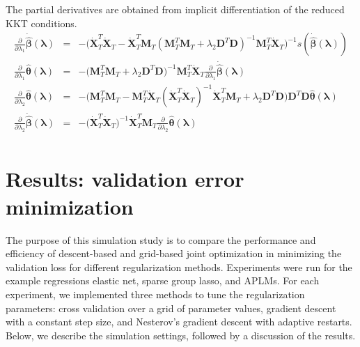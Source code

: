 \documentclass[10pt,letterpaper]{article}
\begin{document}
The partial derivatives are obtained from implicit differentiation of the reduced KKT conditions.
\begin{equation}
\begin{array}{lcl}
\frac{\partial}{\partial \lambda_1} \dot{\hat{\boldsymbol{\beta}}}(\boldsymbol{\lambda})  &=&
-\bigg(\dot{\boldsymbol{X}}_T^T \dot{\boldsymbol{X}}_T
- \dot{\boldsymbol{X}}_T^T \boldsymbol{M}_T(\boldsymbol{M}_T^T \boldsymbol{M}_T
+ \lambda_2 \boldsymbol{D}^T\boldsymbol{D})^{-1} \boldsymbol{M}_T^T \dot{\boldsymbol{X}}_T \bigg)^{-1} 
s( \dot{\hat{\boldsymbol{\beta}}}(\boldsymbol{\lambda})) \\
\frac{\partial }{\partial \lambda_1} \hat{\boldsymbol{\theta}}(\boldsymbol{\lambda}) &=&
-\bigg(\boldsymbol{M}_T^T \boldsymbol{M}_T
+ \lambda_2 \boldsymbol{D}^T \boldsymbol{D}\bigg)^{-1}
\boldsymbol{M}_T^T \dot{\boldsymbol{X}}_T \frac{\partial}{\partial \lambda_1} \dot{\hat{\boldsymbol{\beta}}}(\boldsymbol{\lambda})
\\
\frac{\partial}{\partial \lambda_2}  \hat{\boldsymbol{\theta}}(\boldsymbol{\lambda}) &=&
-\bigg(\boldsymbol{M}_T^T \boldsymbol{M}_T
- \boldsymbol{M}_T^T \dot{\boldsymbol{X}}_T (\dot{\boldsymbol{X}}_T^T\dot{\boldsymbol{X}}_T)^{-1} \dot{\boldsymbol{X}}_T^T \boldsymbol{M}_T + \lambda_2 \boldsymbol{D}^T\boldsymbol{D} \bigg)
\boldsymbol{D}^T\boldsymbol{D} \hat{\boldsymbol{\theta}}(\boldsymbol{\lambda})
\\
\frac{\partial}{\partial \lambda_2} \dot{\hat{\boldsymbol{\beta}}}(\boldsymbol{\lambda}) &=&
- \bigg( \dot{\boldsymbol{X}}_T^T\dot{\boldsymbol{X}}_T\bigg)^{-1}
\dot{\boldsymbol{X}}_T^T \boldsymbol{M}_T
\frac{\partial}{\partial \lambda_2}  \hat{\boldsymbol{\theta}}(\boldsymbol{\lambda})\\
\end{array}
\end{equation}


\section{Results: validation error minimization}

The purpose of this simulation study is to compare the performance and efficiency of descent-based and grid-based joint optimization in minimizing the validation loss for different regularization methods. Experiments were run for the example regressions elastic net, sparse group lasso, and APLMs. For each experiment, we implemented three methods to tune the regularization parameters: cross validation over a grid of parameter values, gradient descent with a constant step size, and Nesterov's gradient descent with adaptive restarts. Below, we describe the simulation settings, followed by a discussion of the results.
\end{document}
